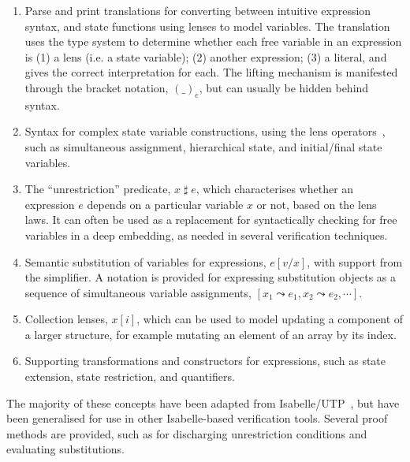 \documentclass[11pt,a4paper]{article}
\begin{document}
\begin{enumerate}
  \item Parse and print translations for converting between intuitive expression syntax,
    and state functions using lenses to model variables. The translation uses the type
    system to determine whether each free variable in an expression is (1) a lens (i.e. a state 
    variable); (2) another expression; (3) a literal, and gives the correct interpretation for each.
    The lifting mechanism is manifested through the bracket notation, $(\_)_e$, but can usually be hidden behind syntax.
  \item Syntax for complex state variable constructions, using the lens operators~\cite{Optics-AFP}, such as simultaneous 
    assignment, hierarchical state, and initial/final state variables.
  \item The ``unrestriction'' predicate, $x \mathop{\sharp} e$, which characterises whether an expression $e$ depends on a
    particular variable $x$ or not, based on the lens laws. It can often be used as a replacement for 
    syntactically checking for free variables in a deep embedding, as needed in several verification
    techniques.
  \item Semantic substitution of variables for expressions, $e[v/x]$, with support from the simplifier. A
    notation is provided for expressing substitution objects as a sequence of simultaneous 
    variable assignments, $[x_1 \leadsto e_1, x_2 \leadsto e_2, \cdots]$.
  \item Collection lenses, $x[i]$, which can be used to model updating a component of a larger structure,
    for example mutating an element of an array by its index.
  \item Supporting transformations and constructors for expressions, such as state extension, 
    state restriction, and quantifiers.
\end{enumerate}

The majority of these concepts have been adapted from Isabelle/UTP~\cite{Foster2020-IsabelleUTP}, but 
have been generalised for use in other Isabelle-based verification tools. Several proof methods are 
provided, such as for discharging unrestriction conditions and evaluating substitutions.





\end{document}
